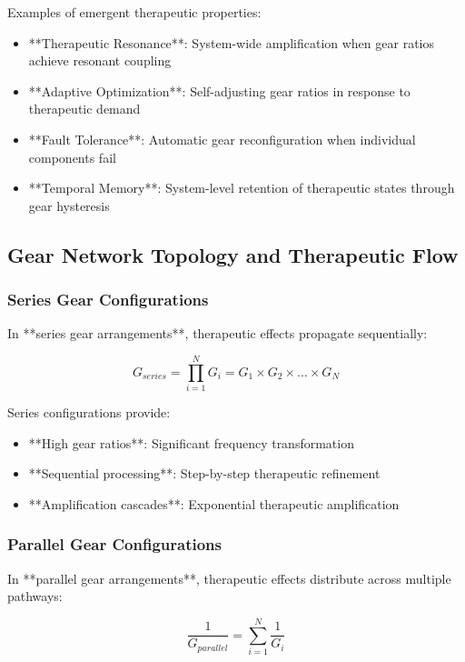 Examples of emergent therapeutic properties:

\begin{itemize}
\item **Therapeutic Resonance**: System-wide amplification when gear ratios achieve resonant coupling
\item **Adaptive Optimization**: Self-adjusting gear ratios in response to therapeutic demand
\item **Fault Tolerance**: Automatic gear reconfiguration when individual components fail
\item **Temporal Memory**: System-level retention of therapeutic states through gear hysteresis
\end{itemize}

\subsection{Gear Network Topology and Therapeutic Flow}

\subsubsection{Series Gear Configurations}

In **series gear arrangements**, therapeutic effects propagate sequentially:

\begin{equation}
G_{series} = \prod_{i=1}^{N} G_i = G_1 \times G_2 \times ... \times G_N
\end{equation}

Series configurations provide:
\begin{itemize}
\item **High gear ratios**: Significant frequency transformation
\item **Sequential processing**: Step-by-step therapeutic refinement
\item **Amplification cascades**: Exponential therapeutic amplification
\end{itemize}

\subsubsection{Parallel Gear Configurations}

In **parallel gear arrangements**, therapeutic effects distribute across multiple pathways:

\begin{equation}
\frac{1}{G_{parallel}} = \sum_{i=1}^{N} \frac{1}{G_i}
\end{equation}

